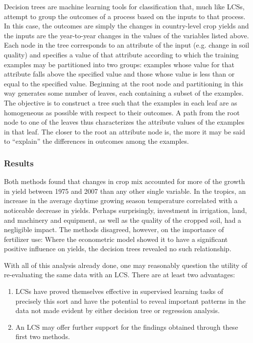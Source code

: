 \documentclass[11pt]{article}
\begin{document}
Decision trees are machine learning tools for classification that, much like LCSs, attempt to group the outcomes of a process based on the inputs to that process. In this case, the outcomes are simply the changes in country-level crop yields and the inputs are the year-to-year changes in the values of the variables listed above. Each node in the tree corresponds to an attribute of the input (e.g. change in soil quality) and specifies a value of that attribute according to which the training examples may be partitioned into two groups: examples whose value for that attribute falls above the specified value and those whose value is less than or equal to the specified value. Beginning at the root node and partitioning in this way generates some number of leaves, each containing a subset of the examples. The objective is to construct a tree such that the examples in each leaf are as homogeneous as possible with respect to their outcomes. A path from the root node to one of the leaves thus characterizes the attribute values of the examples in that leaf. The closer to the root an attribute node is, the more it may be said to ``explain'' the differences in outcomes among the examples.

\subsubsection{Results}
Both methods found that changes in crop mix accounted for more of the growth in yield between 1975 and 2007 than any other single variable. In the tropics, an increase in the average daytime growing season temperature correlated with a noticeable decrease in yields. Perhaps surprisingly, investment in irrigation, land, and machinery and equipment, as well as the quality of the cropped soil, had a negligible impact. The methods disagreed, however, on the importance of fertilizer use: Where the econometric model showed it to have a significant positive influence on yields, the decision trees revealed no such relationship.

With all of this analysis already done, one may reasonably question the utility of re-evaluating the same data with an LCS. There are at least two advantages:

\begin{enumerate}
\item LCSs have proved themselves effective in supervised learning tasks of precisely this sort and have the potential to reveal important patterns in the data not made evident by either decision tree or regression analysis.
\item An LCS may offer further support for the findings obtained through these first two methods.
\end{enumerate}
\end{document}
